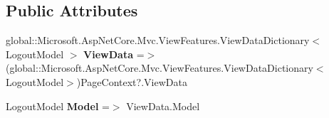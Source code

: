 \subsection*{Public Attributes}
\begin{DoxyCompactItemize}
\item 
\mbox{\label{class_projeto_e_s_w_1_1_areas_1_1_identity_1_1_pages_1_1_account_1_1_areas___identity___pages___account___logout_a78425048e4ad79c4b15827abc02369e1}} 
global\+::\+Microsoft.\+Asp\+Net\+Core.\+Mvc.\+View\+Features.\+View\+Data\+Dictionary$<$ Logout\+Model $>$ {\bfseries View\+Data} =$>$ (global\+::\+Microsoft.\+Asp\+Net\+Core.\+Mvc.\+View\+Features.\+View\+Data\+Dictionary$<$Logout\+Model$>$)Page\+Context?.View\+Data
\item 
\mbox{\label{class_projeto_e_s_w_1_1_areas_1_1_identity_1_1_pages_1_1_account_1_1_areas___identity___pages___account___logout_abd739175b1178f90a1bd17ffbfac1f86}} 
Logout\+Model {\bfseries Model} =$>$ View\+Data.\+Model
\end{DoxyCompactItemize}
